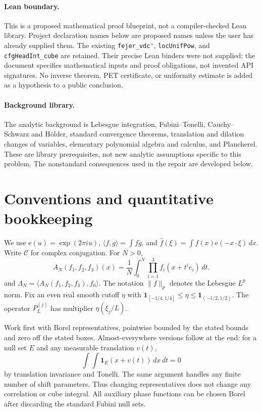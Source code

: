 \documentclass[11pt]{article}
\theoremstyle{definition}
\newcommand{\ee}[1]{\mathrm e\!\left(#1\right)}
\newcommand{\pid}[1]{\nolinkurl{#1}}
\begin{document}
\paragraph{Lean boundary.}
This is a proposed mathematical proof blueprint, not a compiler-checked Lean library.
Project declaration names below are proposed names unless the user has already supplied them.
The existing \pid{fejer_vdc'}, \pid{locUnifPow}, and \pid{cfgHeadInt_cube} are retained.
Their precise Lean binders were not supplied; the document specifies mathematical inputs
and proof obligations, not invented API signatures.  No inverse theorem, PET certificate,
or uniformity estimate is added as a hypothesis to a public conclusion.

\paragraph{Background library.}
The analytic background is Lebesgue integration, Fubini--Tonelli, Cauchy--Schwarz and H\"older,
standard convergence theorems, translation and dilation changes of variables,
elementary polynomial algebra and calculus, and Plancherel.  These are library prerequisites,
not new analytic assumptions specific to this problem.  The nonstandard consequences used
in the repair are developed below.

\section{Conventions and quantitative bookkeeping}\label{patch:conventions}
We use $\ee u=\exp(2\pi i u)$, $\langle f,g\rangle=\int f\overline g$, and
$\widehat f(\xi)=\int f(x)\ee{-x\cdot\xi}\,dx$.  Write $\mathcal C$ for complex conjugation.
For $N>0$,
\[
 A_N(f_1,f_2,f_3)(x)=\frac1N\int_0^N\prod_{i=1}^3f_i(x+t^ie_i)\,dt.
\]
and $\Lambda_N=\langle A_N(f_1,f_2,f_3),f_0\rangle$.
The notation $\|f\|_p$ denotes the Lebesgue $L^p$ norm.
Fix an even real smooth cutoff $\eta$ with
$\mathbf1_{[-1/4,1/4]}\leq\eta\leq\mathbf1_{(-1/2,1/2)}$.
The operator $P_L^{(j)}$ has multiplier $\eta(\xi_j/L)$.

Work first with Borel representatives, pointwise bounded by the stated bounds and zero off
the stated boxes.  Almost-everywhere versions follow at the end: for a null set $E$ and any
measurable translation $v(t)$,
\[
 \int\!\int\mathbf1_E(x+v(t))\,dx\,dt=0
\]
by translation invariance and Tonelli.  The same argument handles any finite number of shift
parameters.  Thus changing representatives does not change any correlation or cube integral.
All auxiliary phase functions can be chosen Borel after discarding the standard Fubini null
sets.
\end{document}
